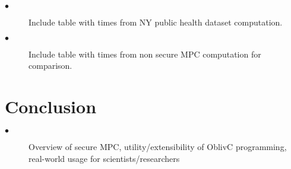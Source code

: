 \documentclass{article}
\begin{document}





\begin{description}
\item[$\bullet$] Include table with times from NY public health dataset computation.
\item[$\bullet$] Include table with times from non secure MPC computation for comparison.
\end{description}
\section{Conclusion}
\begin{description}
\item[$\bullet$] Overview of secure MPC, utility/extensibility of OblivC programming, real-world usage for scientists/researchers
\end{description}
\end{document}

